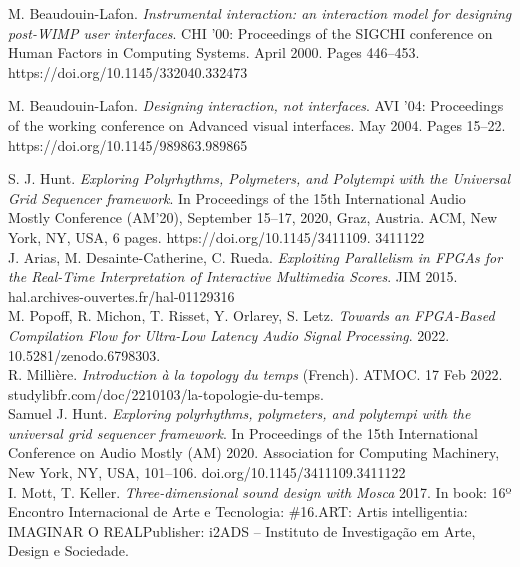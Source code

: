 \documentclass[journal,onecolumn]{IEEEtran}
\begin{document}
\begin{thebibliography}{1}
M. Beaudouin-Lafon. \emph{Instrumental interaction: an interaction model for designing post-WIMP user interfaces}. CHI '00: Proceedings of the SIGCHI conference on Human Factors in Computing Systems. April 2000. Pages 446–453. https://doi.org/10.1145/332040.332473

M. Beaudouin-Lafon. \emph{Designing interaction, not interfaces}. AVI '04: Proceedings of the working conference on Advanced visual interfaces. May 2004. Pages 15–22. https://doi.org/10.1145/989863.989865

S. J. Hunt. \emph{Exploring Polyrhythms, Polymeters, and Polytempi
with the Universal Grid Sequencer framework}. In Proceedings of the 15th
International Audio Mostly Conference (AM’20), September 15–17, 2020, Graz, Austria. ACM, New York, NY, USA, 6 pages. https://doi.org/10.1145/3411109.
3411122 \\

J. Arias, M. Desainte-Catherine, C. Rueda. \emph{Exploiting Parallelism in FPGAs for the Real-Time Interpretation of Interactive Multimedia Scores}. JIM 2015. hal.archives-ouvertes.fr/hal-01129316 \\

M. Popoff, R. Michon, T. Risset, Y. Orlarey, S. Letz. \emph{Towards an FPGA-Based Compilation Flow for Ultra-Low Latency Audio Signal Processing}. 2022. 10.5281/zenodo.6798303. \\

R. Millière. \emph{Introduction à la topology du temps} (French). ATMOC. 17 Feb 2022. studylibfr.com/doc/2210103/la-topologie-du-temps. \\

Samuel J. Hunt. \emph{Exploring polyrhythms, polymeters, and polytempi with the universal grid sequencer framework}. In Proceedings of the 15th International Conference on Audio Mostly (AM) 2020. Association for Computing Machinery, New York, NY, USA, 101–106. doi.org/10.1145/3411109.3411122 \\

I. Mott, T. Keller. \emph{Three-dimensional sound design with Mosca} 
2017. In book: 16º Encontro Internacional de Arte e Tecnologia: \#16.ART: Artis intelligentia: IMAGINAR O REALPublisher: i2ADS – Instituto de Investigação em Arte, Design e Sociedade. \\


\end{thebibliography}
\end{document}

